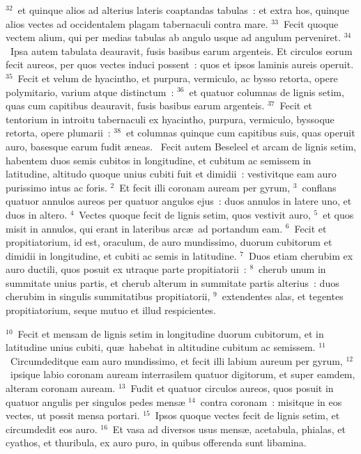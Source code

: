 ${}^{32}$~et quinque alios ad alterius lateris coaptandas tabulas~: et extra hos, quinque alios vectes ad occidentalem plagam tabernaculi contra mare.
${}^{33}$~Fecit quoque vectem alium, qui per medias tabulas ab angulo usque ad angulum perveniret.
${}^{34}$~Ipsa autem tabulata deauravit, fusis basibus earum argenteis. Et circulos eorum fecit aureos, per quos vectes induci possent~: quos et ipsos laminis aureis operuit.
${}^{35}$~Fecit et velum de hyacintho, et purpura, vermiculo, ac bysso retorta, opere polymitario, varium atque distinctum~:
${}^{36}$~et quatuor columnas de lignis setim, quas cum capitibus deauravit, fusis basibus earum argenteis.
${}^{37}$~Fecit et tentorium in introitu tabernaculi ex hyacintho, purpura, vermiculo, byssoque retorta, opere plumarii~:
${}^{38}$~et columnas quinque cum capitibus suis, quas operuit auro, basesque earum fudit \ae neas.
~Fecit autem Beseleel et arcam de lignis setim, habentem duos semis cubitos in longitudine, et cubitum ac semissem in latitudine, altitudo quoque unius cubiti fuit et dimidii~: vestivitque eam auro purissimo intus ac foris.
${}^{2}$~Et fecit illi coronam auream per gyrum,
${}^{3}$~conflans quatuor annulos aureos per quatuor angulos ejus~: duos annulos in latere uno, et duos in altero.
${}^{4}$~Vectes quoque fecit de lignis setim, quos vestivit auro,
${}^{5}$~et quos misit in annulos, qui erant in lateribus arc\ae\ ad portandum eam.
${}^{6}$~Fecit et propitiatorium, id est, oraculum, de auro mundissimo, duorum cubitorum et dimidii in longitudine, et cubiti ac semis in latitudine.
${}^{7}$~Duos etiam cherubim ex auro ductili, quos posuit ex utraque parte propitiatorii~:
${}^{8}$~cherub unum in summitate unius partis, et cherub alterum in summitate partis alterius~: duos cherubim in singulis summitatibus propitiatorii,
${}^{9}$~extendentes alas, et tegentes propitiatorium, seque mutuo et illud respicientes.


${}^{10}$~Fecit et mensam de lignis setim in longitudine duorum cubitorum, et in latitudine unius cubiti, qu\ae\ habebat in altitudine cubitum ac semissem.
${}^{11}$~Circumdeditque eam auro mundissimo, et fecit illi labium aureum per gyrum,
${}^{12}$~ipsique labio coronam auream interrasilem quatuor digitorum, et super eamdem, alteram coronam auream.
${}^{13}$~Fudit et quatuor circulos aureos, quos posuit in quatuor angulis per singulos pedes mens\ae 
${}^{14}$~contra coronam~: misitque in eos vectes, ut possit mensa portari.
${}^{15}$~Ipsos quoque vectes fecit de lignis setim, et circumdedit eos auro.
${}^{16}$~Et vasa ad diversos usus mens\ae , acetabula, phialas, et cyathos, et thuribula, ex auro puro, in quibus offerenda sunt libamina.



